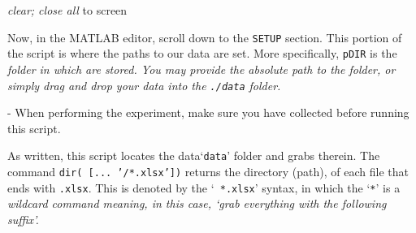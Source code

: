 \documentclass[11pt, letterpaper]{article}
\begin{document}
\IncMargin{1em}
\begin{algorithm}[t]

    \emph{clear; close all}\;
    \;
    \;
    \BlankLine
     \;
      to screen\;
\end{algorithm}


Now, in the MATLAB editor, scroll down to the \texttt{SETUP} section. This portion of the script is where the paths to our data are set. More specifically, \texttt{pDIR} is the \it{folder} in which  are stored. You may provide the absolute path to the folder, or simply drag and drop your data into the \texttt{./data} folder.
\n

\begin{center}
\begin{tcolorbox}[enhanced, width=14cm, size=tight, top=-2mm, colback=red!5, colframe=black!50!white, boxrule=0.25pt, boxsep=2mm]
\n
{\small
{} - When performing the experiment, make sure you have  collected before running this script.
}
\end{tcolorbox}
\end{center}

As written, this script locates the data`\texttt{data}' folder and grabs  therein. The command \texttt{dir( [... '/*.xlsx'])} returns the directory (path), of each file that ends with \texttt{.xlsx}. This is denoted by the `\texttt{ *.xlsx}' syntax, in which the `\texttt{*}' is a \it{wildcard} command meaning, in this case, \it{`grab everything with the following suffix'}. 
\end{document}
